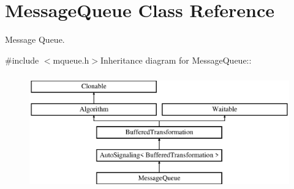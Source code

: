 \hypertarget{class_message_queue}{
\section{MessageQueue Class Reference}
\label{class_message_queue}
}


Message Queue.  


{\ttfamily \#include $<$mqueue.h$>$}Inheritance diagram for MessageQueue::\begin{figure}[H]
\begin{center}
\leavevmode
\includegraphics[height=5cm]{class_message_queue}
\end{center}
\end{figure}
